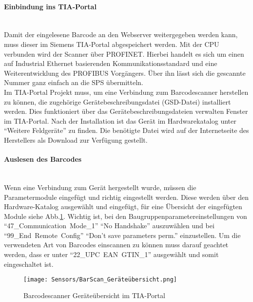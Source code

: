 \paragraph{Einbindung ins TIA-Portal \cite{BarScan_Handbuch}}\mbox{}\\
Damit der eingelesene Barcode an den Webserver weitergegeben werden kann, muss dieser im Siemens TIA-Portal abgespeichert werden. Mit der CPU verbunden wird der Scanner über PROFINET. Hierbei handelt es sich um einen auf Industrial Ethernet basierenden Kommunikationsstandard und eine Weiterentwicklung des PROFIBUS Vorgängers. Über ihn lässt sich die gescannte Nummer ganz einfach an die SPS übermitteln.\\
Im TIA-Portal Projekt muss, um eine Verbindung zum Barcodescanner herstellen zu können, die zugehörige Gerätebeschreibungsdatei (GSD-Datei) installiert werden. Dies funktioniert über das Gerätebeschreibungsdateien verwalten Fenster im TIA-Portal. Nach der Installation ist das Gerät im Hardwarekatalog unter \enquote{Weitere Feldgeräte} zu finden. Die benötigte Datei wird auf der Internetseite des Herstellers als Download zur Verfügung gestellt.

\paragraph{Auslesen des Barcodes}\mbox{}\\
Wenn eine Verbindung zum Gerät hergestellt wurde, müssen die Parametermodule eingefügt und richtig eingestellt werden. Diese werden über den Hardware-Katalog ausgewählt und eingefügt, für eine Übersicht der eingefügten Module siehe Abb.\ref{BarScan_TIA}. Wichtig ist, bei den Baugruppenparametereinstellungen von \enquote{\mbox{47\_Communication Mode\_1}} \enquote{No Handshake} auszuwählen und bei \enquote{\mbox{99\_End Remote Config}}
\enquote{Don't save parameters perm.} einzustellen. Um die verwendeten Art von Barcodes einscannen zu können muss darauf geachtet werden, dass er unter \enquote{\mbox{22\_UPC EAN GTIN\_1}} ausgewählt und somit eingeschaltet ist.\\

\begin{figure}[H]
    \centering
    \texttt{[image: Sensors/BarScan\_Geräteübersicht.png]}
    \caption{Barcodescanner Geräteübersicht im TIA-Portal}
    \label{BarScan_TIA}
\end{figure}

